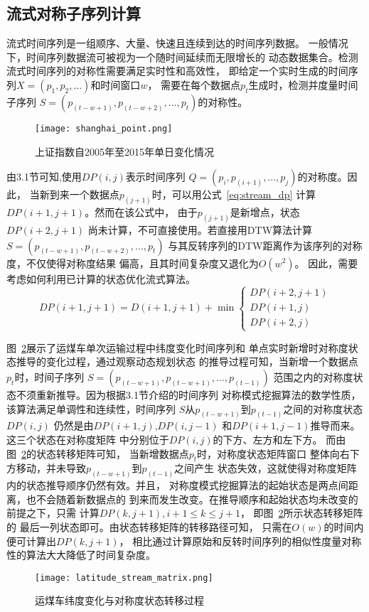 \subsection{流式对称子序列计算}
流式时间序列是一组顺序、大量、快速且连续到达的时间序列数据。
一般情况下，时间序列数据流可被视为一个随时间延续而无限增长的
动态数据集合。检测流式时间序列的对称性需要满足实时性和高效性，
即给定一个实时生成的时间序列$X=(p_1,p_2,\dots)$和时间窗口$w$，
需要在每个数据点$p_t$生成时，检测并度量时间子序列
$S=\left(p_(t-w+1),p_(t-w+2),\dots,p_t \right)$的对称性。
\begin{figure}
  \centering
  \texttt{[image: shanghai\_point.png]}
  \caption{上证指数自2005年至2015年单日变化情况}
  \label{fig:shanghai_point}
\end{figure}
由3.1节可知,使用$DP\left(i,j\right)$表示时间序列
$Q=(p_i,p_(i+1),\dots,p_j )$的对称度。因此，
当新到来一个数据点$p_(j+1)$时，可以用公式~\ref{eq:stream_dp}
计算$DP\left(i+1,j+1\right)$。然而在该公式中，
由于$p_(j+1)$是新增点，状态$DP\left(i+2,j+1\right)$
尚未计算，不可直接使用。若直接用DTW算法计算
$S=\left(p_(t-w+1),p_(t-w+2),…,p_t \right)$
与其反转序列的DTW距离作为该序列的对称度，不仅使得对称度结果
偏高，且其时间复杂度又退化为$O\left(w^2\right)$。
因此，需要考虑如何利用已计算的状态优化流式算法。
\begin{equation}
  DP(i+1, j+1)=D(i+1, j+1)+\min \left\{\begin{array}{c}
    D P(i+2, j+1) \\
    D P(i+1, j) \\
    D P(i+2, j)
    \end{array}\right.
  \label{eq:stream_dp}
\end{equation}

图~\ref{fig:latitude_stream_matrix}展示了运煤车单次运输过程中纬度变化时间序列和
单点实时新增时对称度状态推导的变化过程，通过观察动态规划状态
的推导过程可知，当新增一个数据点$p_t$时，时间子序列
$S=\left(p_(t-w+1),p_(t-w+1),…,p_(t-1) \right)$
范围之内的对称度状态不须重新推导。因为根据3.1节介绍的时间序列
对称模式挖掘算法的数学性质，该算法满足单调性和连续性，时间序列
$S$从$p_(t-w+1)$到$p_(t-1)$之间的对称度状态$DP\left(i,j\right)$
仍然是由$DP\left(i+1,j\right)$,$DP\left(i,j-1\right)$
和$DP\left(i+1,j-1\right)$推导而来。这三个状态在对称度矩阵
中分别位于$DP\left(i,j\right)$的下方、左方和左下方。
而由图~\ref{fig:latitude_stream_matrix}的状态转移矩阵可知，
当新增数据点$p_t$时，对称度状态矩阵窗口
整体向右下方移动，并未导致$p_(t-w+1)$到$p_(t-1)$之间产生
状态失效，这就使得对称度矩阵内的状态推导顺序仍然有效。并且，
对称度模式挖掘算法的起始状态是两点间距离，也不会随着新数据点的
到来而发生改变。在推导顺序和起始状态均未改变的前提之下，只需
计算$DP\left(k,j+1\right),i+1\leq k \leq j+1$，
即图~\ref{fig:latitude_stream_matrix}所示状态转移矩阵的
最后一列状态即可。由状态转移矩阵的转移路径可知，
只需在$O\left(w\right)$的时间内便可计算出$DP\left(k,j+1\right)$，
相比通过计算原始和反转时间序列的相似性度量对称性的算法大大降低了时间复杂度。
\begin{figure}
  \centering
  \texttt{[image: latitude\_stream\_matrix.png]}
  \caption{运煤车纬度变化与对称度状态转移过程}
  \label{fig:latitude_stream_matrix}
\end{figure}

